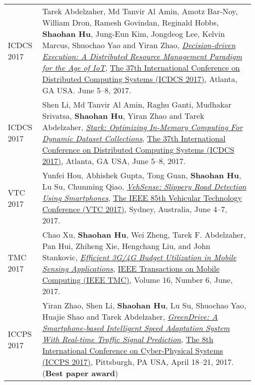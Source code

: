 \begin{longtabu}{p{.51\sectionwidth} p{.78\resumewidth}}
{\sc ICDCS 2017}\hypertarget{abdelzaher2017icdcs}{} &
Tarek Abdelzaher, Md Tanvir Al Amin, Amotz Bar-Noy, William Dron, Ramesh Govindan, Reginald Hobbs, \textbf{Shaohan Hu}, Jung-Eun Kim, Jongdeog Lee, Kelvin Marcus, Shuochao Yao and Yiran Zhao,
\href{http://ieeexplore.ieee.org/document/7980121}{\emph{Decision-driven Execution: A Distributed Resource Management Paradigm for the Age of IoT}},
\href{http://icdcs2017.gatech.edu/}{\textsf{The 37th International Conference on Distributed Computing Systems (ICDCS 2017)}},
Atlanta, GA USA. June 5--8, 2017. \\

{\sc ICDCS 2017}\hypertarget{li2017icdcs}{} &
Shen Li, Md Tanvir Al Amin, Raghu Ganti, Mudhakar Srivatsa, \textbf{Shaohan Hu}, Yiran Zhao and Tarek Abdelzaher,
\href{http://ieeexplore.ieee.org/document/7979959}{\emph{Stark: Optimizing In-Memory Computing For Dynamic Dataset Collections}},
\href{http://icdcs2017.gatech.edu/}{\textsf{The 37th International Conference on Distributed Computing Systems (ICDCS 2017)}},
Atlanta, GA USA, June 5--8, 2017. \\

{\sc VTC 2017}\hypertarget{hou2017vtc}{} &
Yunfei Hou, Abhishek Gupta, Tong Guan, \textbf{Shaohan Hu}, Lu Su, Chunming Qiao,
\href{https://arxiv.org/abs/1705.03955}{\emph{VehSense: Slippery Road Detection Using Smartphones}},
\href{http://ieeevtc.org/vtc2017spring}{\textsf{The IEEE 85th Vehicular Technology Conference (VTC 2017)}},
Sydney, Australia, June 4--7, 2017. \\

{\sc TMC 2017}\hypertarget{xu2017tmc}{} &
Chao Xu, \textbf{Shaohan Hu}, Wei Zheng, Tarek F. Abdelzaher, Pan Hui, Zhiheng Xie, Hengchang Liu, and John Stankovic,
\href{http://ieeexplore.ieee.org/document/7539667}{\emph{Efficient 3G/4G Budget Utilization in Mobile Sensing Applications}},
\href{http://www.computer.org/web/tmc}{\textsf{IEEE Transactions on Mobile Computing (IEEE TMC)}},
Volume 16, Number 6, June, 2017. \\

{\sc ICCPS 2017}\hypertarget{zhao2017iccps}{} &
Yiran Zhao, Shen Li, \textbf{Shaohan Hu}, Lu Su, Shuochao Yao, Huajie Shao and Tarek Abdelzaher,
\href{http://dl.acm.org/citation.cfm?id=3055009}{\emph{GreenDrive: A Smartphone-based Intelligent Speed Adaptation System With Real-time Traffic Signal Prediction}},
\href{http://iccps2017.cse.wustl.edu}{\textsf{The 8th International Conference on Cyber-Physical Systems (ICCPS 2017)}},
Pittsburgh, PA USA, April 18--21, 2017. (\textbf{Best paper award}) \\


\end{longtabu}
